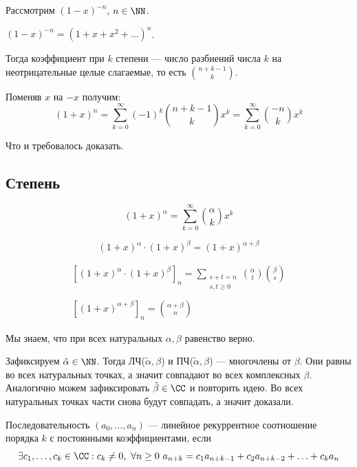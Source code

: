 Рассмотрим \( (1 - x)^{-n} \), \( n \in \NN \).

\( (1 - x)^{-n} = (1 + x + x^2 + \ldots)^n \).

Тогда коэффициент при \( k \) степени --- число разбиений числа \( k \) на неотрицательные целые слагаемые, то есть \( \binom{n + k - 1}{k} \).

Поменяв \( x \) на \( -x \) получим:
\[
    (1 + x)^{n} = \sum\limits_{k = 0}^{\infty} (-1)^k \binom{n + k - 1}{k} x^k = \sum\limits_{k = 0}^{\infty} \binom{-n}{k} x^k
\]

Что и требовалось доказать.

\subsection{Степень}

\begin{defn}{}{}
    \[
        (1 + x)^{\alpha} = \sum\limits_{k = 0}^{\infty} \binom{\alpha}{k} x^k
    \]
\end{defn}

\begin{lemma}{}{}
    \[
        (1 + x)^{\alpha} \cdot (1 + x)^{\beta} = (1 + x)^{\alpha + \beta}
    \]
\end{lemma}

\begin{gather*}
    \left[ (1 + x)^{\alpha} \cdot (1 + x)^{\beta} \right]_n
    =
    \sum\limits_{\substack{s + t = n \\ s, t \geq 0}} \binom{\alpha}{t} \binom{\beta}{s}
    \\
    \\
    \left[ (1 + x)^{\alpha + \beta} \right]_n = \binom{\alpha + \beta}{n}
\end{gather*}

Мы знаем, что при всех натуральных \( \alpha, \beta \) равенство верно.

Зафиксируем \( \tilde{\alpha} \in \NN \).
Тогда ЛЧ(\( \tilde{\alpha}, \beta \)) и ПЧ(\( \tilde{\alpha}, \beta \)) --- многочлены от \( \beta \).
Они равны во всех натуральных точках, а значит совпадают во всех комплексных \( \beta \).
Аналогично можем зафиксировать \( \tilde{\beta} \in \CC \) и повторить идею.
Во всех натуральных точках части снова будут совпадать, а значит доказали.

\begin{defn}{}{}
    Последовательность \( (a_0, \ldots, a_n) \) --- линейное рекуррентное соотношение порядка \( k \) с постоянными коэффициентами,
    если
    \[
        \exists c_1, \ldots, c_k \in \CC : c_k \neq 0, \ \forall n \geq 0 \ a_{n + k} = c_1 a_{n + k - 1} + c_2 a_{n + k - 2} + \ldots + c_k a_n
    \]
\end{defn}

